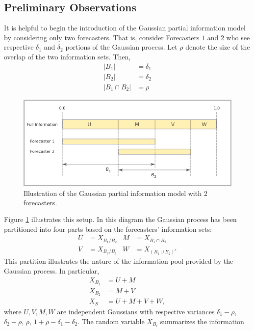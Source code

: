 \documentclass[11pt]{article}
\theoremstyle{definition}
\theoremstyle{definition}
\begin{document}
\subsection{Preliminary Observations}
\label{prelim}
 It is helpful to begin the introduction of the Gaussian partial
information model by considering only two forecasters.  That is,
consider Forecasters $1$ and $2$ who see respective $\delta_1$ and
$\delta_2$ portions of the Gaussian process.  Let $\rho$ denote the
size of the overlap of the two information sets. Then,
\begin{align*}
|B_1| &= \delta_1\\
|B_2| &= \delta_2\\
|B_1 \cap B_2| &= \rho
\end{align*}
\begin{figure}[htbp]
   \includegraphics[width = \textwidth]{N=2} %
   \caption{Illustration of the Gaussian partial information model with $2$ forecasters.}
   \label{diagram2}
\end{figure}
Figure \ref{diagram2} illustrates this setup.  In this diagram the
Gaussian process has been partitioned into four parts based on the
forecasters' information sets:
\begin{align*}
 U &= X_{B_1 / B_2}
& M &= X_{B_1 \cap B_2}\\
 V &= X_{B_2 / B_1}
& W &= X_{(B_1 \cup B_2)^c}
\end{align*}
This partition illustrates the nature of the information pool provided
by the Gaussian process. In particular,
\begin{align*}
X_{B_1} &= U + M\\
X_{B_2} &= M + V\\
X_S &= U+M+V+W,
\end{align*}
where $U, V, M, W$ are independent Gaussians with respective variances
$\delta_1-\rho$, $\delta_2-\rho$, $\rho$, $1+\rho-\delta_1 -
\delta_2$.  The random variable $X_{B_i}$ summarizes the information
\end{document}
